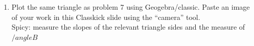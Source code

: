 \documentclass[12pt, twoside]{article}
\begin{document}
\begin{enumerate}
\newpage
\item Plot the same triangle as problem 7 using Geogebra/classic. Paste an image of your work in this Classkick slide using the ``camera'' tool.\\[0.25cm]
Spicy: measure the slopes of the relevant triangle sides and the measure of $/angle B$

    
\end{enumerate}
\end{document}
